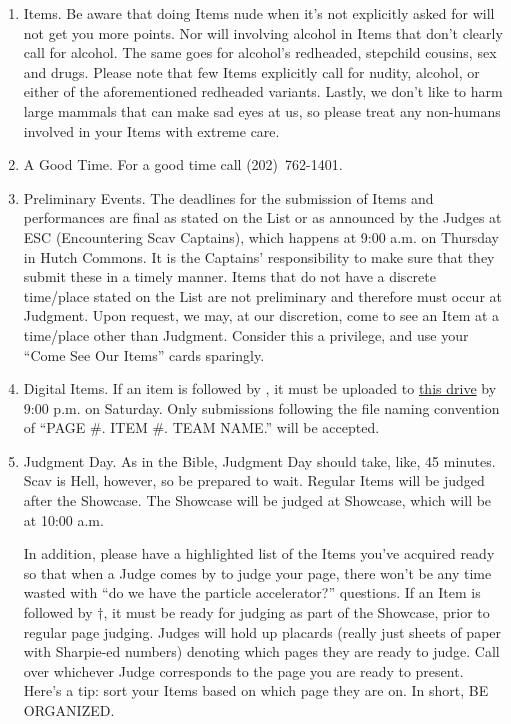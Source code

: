 \documentclass{book}
\begin{document}
\begin{enumerate}
\item Items. Be aware that doing Items nude when it's not explicitly asked for will not get you more points. Nor will involving alcohol in Items that don't clearly call for alcohol. The same goes for alcohol's redheaded, stepchild cousins, sex and drugs.  Please note that few Items explicitly call for nudity, alcohol, or either of the aforementioned redheaded variants. Lastly, we don't like to harm large mammals that can make sad eyes at us, so please treat any non-humans involved in your Items with extreme care.

\item  A Good Time.  For a good time call (202)~762-1401.

\item Preliminary Events. The deadlines for the submission of Items and performances are final as stated on the List or as announced by the Judges at ESC (Encountering Scav Captains), which happens at 9:00 a.m. on Thursday in Hutch Commons. It is the Captains' responsibility to make sure that they submit these in a timely manner. Items that do not have a discrete time/place stated on the List are not preliminary and therefore must occur at Judgment. Upon request, we may, at our discretion, come to see an Item at a time/place other than Judgment. Consider this a privilege, and use your ``Come See Our Items'' cards sparingly.

\item Digital Items. If an item is followed by \textleaf, it must be uploaded to \href{https://drive.google.com/drive/folders/1x7-JnlKem2LTp2UmHd899xbTdwMGbSMR?usp=sharing}{this drive} by 9:00 p.m. on Saturday. Only submissions following the file naming convention of “PAGE \#. ITEM \#. TEAM NAME.” will be accepted.

\item Judgment Day.
As in the Bible, Judgment Day should take, like, 45 minutes. Scav is Hell, however, so be prepared to wait. Regular Items will be judged after the Showcase. The Showcase will be judged at Showcase, which will be at 10:00 a.m.

In addition, please have a highlighted list of the Items you've acquired ready so that when a Judge comes by to judge your page, there won't be any time wasted with ``do we have the particle accelerator?'' questions. If an Item is followed by $\dagger$, it must be ready for judging as part of the Showcase, prior to regular page judging. Judges will hold up placards (really just sheets of paper with Sharpie-ed numbers) denoting which pages they are ready to judge. Call over whichever Judge corresponds to the page you are ready to present. Here's a tip: sort your Items based on which page they are on. In short, BE ORGANIZED.


\end{enumerate}
\end{document}

